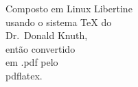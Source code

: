 	\begin{center}
	\vspace*{\fill}
	\vspace*{\fill}
	\end{center}

\vspace*{\fill}
	\begin{flushright}
	{\large 
	Composto em Linux Libertine \\
	usando o sistema \TeX{} do \\
	Dr.~Donald Knuth, \\
	então convertido \\
	em .pdf pelo \\
	pdflatex. \\}
	\end{flushright}

